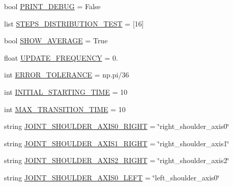 \begin{DoxyCompactItemize}
\item 
bool \mbox{\hyperlink{namespacesteering__response__test_ad1f59f86db9d652fab330e428ed5da02}{P\+R\+I\+N\+T\+\_\+\+D\+E\+B\+UG}} = False
\item 
list \mbox{\hyperlink{namespacesteering__response__test_a081aa450261c9e470adfd1150a3f50eb}{S\+T\+E\+P\+S\+\_\+\+D\+I\+S\+T\+R\+I\+B\+U\+T\+I\+O\+N\+\_\+\+T\+E\+ST}} = \mbox{[}16\mbox{]}
\item 
bool \mbox{\hyperlink{namespacesteering__response__test_aa6fc397e6e5de1f7b0d059e6ea233d2c}{S\+H\+O\+W\+\_\+\+A\+V\+E\+R\+A\+GE}} = True
\item 
float \mbox{\hyperlink{namespacesteering__response__test_ab685e4ed236a425a07c248cd13d644d9}{U\+P\+D\+A\+T\+E\+\_\+\+F\+R\+E\+Q\+U\+E\+N\+CY}} = 0.
\item 
int \mbox{\hyperlink{namespacesteering__response__test_a702b98eb6ae98095dfa6d0252a5dcdd4}{E\+R\+R\+O\+R\+\_\+\+T\+O\+L\+E\+R\+A\+N\+CE}} = np.\+pi/36
\item 
int \mbox{\hyperlink{namespacesteering__response__test_a9f4caaa601fe5b35916c6935b242fd0b}{I\+N\+I\+T\+I\+A\+L\+\_\+\+S\+T\+A\+R\+T\+I\+N\+G\+\_\+\+T\+I\+ME}} = 10
\item 
int \mbox{\hyperlink{namespacesteering__response__test_a1c7b965933c996e3095cc74981e5a90c}{M\+A\+X\+\_\+\+T\+R\+A\+N\+S\+I\+T\+I\+O\+N\+\_\+\+T\+I\+ME}} = 10
\item 
string \mbox{\hyperlink{namespacesteering__response__test_ad45210818a3ecfe1b40fa4e5070f8882}{J\+O\+I\+N\+T\+\_\+\+S\+H\+O\+U\+L\+D\+E\+R\+\_\+\+A\+X\+I\+S0\+\_\+\+R\+I\+G\+HT}} = \char`\"{}right\+\_\+shoulder\+\_\+axis0\char`\"{}
\item 
string \mbox{\hyperlink{namespacesteering__response__test_a4e88b0ab1ec0061733d68683fea270ff}{J\+O\+I\+N\+T\+\_\+\+S\+H\+O\+U\+L\+D\+E\+R\+\_\+\+A\+X\+I\+S1\+\_\+\+R\+I\+G\+HT}} = \char`\"{}right\+\_\+shoulder\+\_\+axis1\char`\"{}
\item 
string \mbox{\hyperlink{namespacesteering__response__test_a9791c4166f675c931919612e021a11db}{J\+O\+I\+N\+T\+\_\+\+S\+H\+O\+U\+L\+D\+E\+R\+\_\+\+A\+X\+I\+S2\+\_\+\+R\+I\+G\+HT}} = \char`\"{}right\+\_\+shoulder\+\_\+axis2\char`\"{}
\item 
string \mbox{\hyperlink{namespacesteering__response__test_a955fe125b411d473b0a283b0ab1fa9c6}{J\+O\+I\+N\+T\+\_\+\+S\+H\+O\+U\+L\+D\+E\+R\+\_\+\+A\+X\+I\+S0\+\_\+\+L\+E\+FT}} = \char`\"{}left\+\_\+shoulder\+\_\+axis0\char`\"{}
\item 

\end{DoxyCompactItemize}
